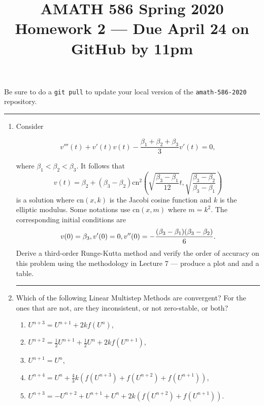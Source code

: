 \documentclass[10pt]{amsart}
\newcommand{\half}{\frac{1}{2}}
\newcommand\unp{U^{n+1}}
\begin{document}
\pagestyle{empty}

\newcommand{\mline}{\vspace{.2in}\hrule\vspace{.2in}}


\title{\bf { AMATH 586 Spring 2020 \\ Homework 2 ---
Due April 24 on GitHub by 11pm} }
\maketitle
\centerline{Be sure to do a {\tt git pull} to update your local version of the {\tt amath-586-2020} repository.}

\mline
\begin{enumerate}[label={\bf Problem~{\arabic*}:}]
  \item Consider

$$ v'''(t) + v'(t) v(t) - \frac{\beta_1 + \beta_2 + \beta_3}{3} v'(t) =0, $$

where $\beta_1 < \beta_2 < \beta_3$.  It follows that
$$
v(t) = \beta_2 + (\beta_3 - \beta_2) \mathrm{cn}^2\left( \sqrt{ \frac{\beta_3 - \beta_1}{12}} t, \sqrt{\frac{\beta_3 - \beta_2}{\beta_3 - \beta_1}} \right)
$$
is a solution where $\mathrm{cn}(x,k)$ is the Jacobi cosine function and $k$ is the elliptic modulus.  Some notations use $\mathrm{cn}(x,m)$ where $m = k^2$.  The corresponding initial conditions are
$$
v(0) = \beta_3, \\
v'(0) = 0,\\
v''(0) = -\frac{(\beta_3 - \beta_1)(\beta_3-\beta_2)}{6}.$$
Derive a third-order Runge-Kutta method and verify the order of accuracy on this problem using the methodology in Lecture 7 --- produce a plot and and a table.
\mline
\item  Which of the following Linear Multistep Methods are convergent?  For 
the ones that are not, are they inconsistent, or not zero-stable, or both?
 \begin{enumerate}
 \item $U^{n+3} = U^{n+1} + 2kf(U^n)$,
 \item $U^{n+2} = \half U^{n+1} + \half U^{n} + 2kf(U^{n+1})$,
 \item $\unp = U^n$, 
 \item $U^{n+4} = U^{n} + \frac 4 3 k(f(U^{n+3})+f(U^{n+2})+f(U^{n+1}))$,
 \item $U^{n+3} = -U^{n+2} + U^{n+1} +U^{n}+2k(f(U^{n+2})+f(U^{n+1}))$.
 \end{enumerate}


\end{enumerate}
\end{document}
